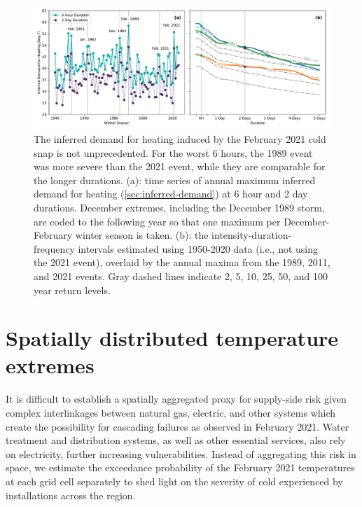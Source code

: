\documentclass[12pt]{iopart}
\providecommand{\DIFadd}[1]{{\protect\color{blue}\uwave{#1}}} %
\providecommand{\DIFaddFL}[1]{\DIFadd{#1}} %
\providecommand{\DIFaddbeginFL}{} %
\providecommand{\DIFaddendFL}{} %
\newcommand{\DIFaddincludegraphics}[2][]{{\color{blue}\fbox{\DIFOincludegraphics[#1]{#2}}}} %
\DeclareRobustCommand{\DIFaddbeginFL}{\DIFOaddbeginFL \let\includegraphics\DIFaddincludegraphics} %
\DeclareRobustCommand{\DIFaddendFL}{\DIFOaddendFL \let\includegraphics\DIFOincludegraphics} %
\begin{document}
\begin{figure}
  \centering
  \includegraphics[width=\textwidth]{ERCOT_HDD_IDF_MLE_popweighted.pdf}
  \caption{
    The inferred \DIFaddbeginFL \DIFaddFL{per capita }\DIFaddendFL demand for heating induced by the February 2021 cold snap is not unprecedented.
    For the worst 6 hours, the 1989 event was more severe than the 2021 event, while they are comparable for the longer durations.
    (a): time series of annual maximum inferred \DIFaddbeginFL \DIFaddFL{per capita }\DIFaddendFL demand for heating (\cref{sec:inferred-demand}) at 6 hour and 2 day durations.
    December extremes, including the December 1989 storm, are coded to the following year so that one maximum per December-February winter season is taken.
    (b): the intensity-duration-frequency intervals estimated using 1950-2020 data (i.e., not using the 2021 event), overlaid by the annual maxima from the 1989, 2011, and 2021 events.
    Gray dashed lines indicate 2, 5, 10, 25, 50, and 100 year return levels.
  }\label{fig:idf_weighted}
\end{figure}

\section{Spatially distributed temperature extremes}

It is difficult to establish a spatially aggregated proxy for supply-side risk given complex interlinkages between natural gas, electric, and other systems which create the possibility for cascading failures as observed in February 2021.
Water treatment and distribution systems, as well as other essential services, also rely on electricity, further increasing vulnerabilities.
Instead of aggregating this risk in space, we estimate the exceedance probability of the February 2021 temperatures at each grid cell separately to shed light on the severity of cold experienced by installations across the region.
\end{document}
